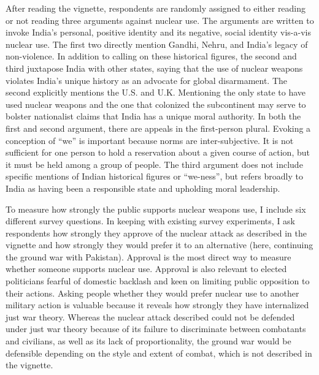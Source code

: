 \documentclass[12pt]{article}
\begin{document}
After reading the vignette, respondents are randomly assigned to either reading or not reading three arguments against nuclear use. The arguments are written to invoke India's personal, positive identity and its negative, social identity vis-a-vis nuclear use. The first two directly mention Gandhi, Nehru, and India's legacy of non-violence. In addition to calling on these historical figures, the second and third juxtapose India with other states, saying that the use of nuclear weapons violates India's unique history as an advocate for global disarmament. The second explicitly mentions the U.S. and U.K. Mentioning the only state to have used nuclear weapons and the one that colonized the subcontinent may serve to bolster nationalist claims that India has a unique moral authority. In both the first and second argument, there are appeals in the first-person plural. Evoking a conception of “we” is important because norms are inter-subjective. It is not sufficient for one person to hold a reservation about a given course of action, but it must be held among a group of people. The third argument does not include specific mentions of Indian historical figures or “we-ness”, but refers broadly to India as having been a responsible state and upholding moral leadership. 

To measure how strongly the public supports nuclear weapons use, I include six different survey questions. In keeping with existing survey experiments, I ask respondents how strongly they approve of the nuclear attack as described in the vignette and how strongly they would prefer it to an alternative (here, continuing the ground war with Pakistan). Approval is the most direct way to measure whether someone supports nuclear use. Approval is also relevant to elected politicians fearful of domestic backlash and keen on limiting public opposition to their actions. Asking people whether they would prefer nuclear use to another military action is valuable because it reveals how strongly they have internalized just war theory. Whereas the nuclear attack described could not be defended under just war theory because of its failure to discriminate between combatants and civilians, as well as its lack of proportionality, the ground war would be defensible depending on the style and extent of combat, which is not described in the vignette. 
\end{document}
